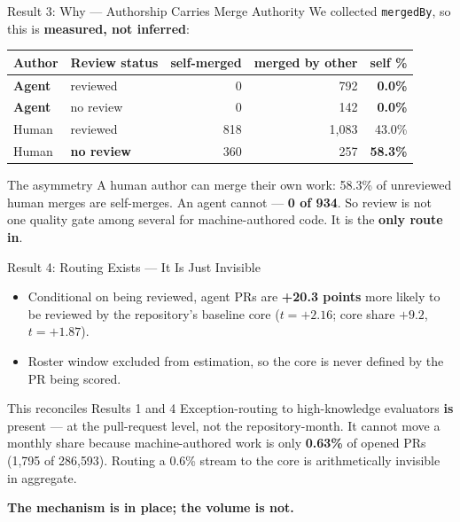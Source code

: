 \begin{frame}{Result 3: Why --- Authorship Carries Merge Authority}
We collected \texttt{mergedBy}, so this is \textbf{measured, not inferred}:
\begin{center}\small
\begin{tabular}{llrrr}
\toprule
Author & Review status & self-merged & merged by other & self \%\\
\midrule
\textbf{Agent} & reviewed & 0 & 792 & \textbf{0.0\%}\\
\textbf{Agent} & no review & 0 & 142 & \textbf{0.0\%}\\
Human & reviewed & 818 & 1{,}083 & 43.0\%\\
Human & \textbf{no review} & 360 & 257 & \textbf{58.3\%}\\
\bottomrule
\end{tabular}
\end{center}
\vfill
\begin{block}{The asymmetry}
  A human author can merge their own work: 58.3\% of unreviewed human merges
  are self-merges. An agent cannot --- \textbf{0 of 934}. So review is not one
  quality gate among several for machine-authored code. It is the
  \textbf{only route in}.
\end{block}
\end{frame}

\begin{frame}{Result 4: Routing Exists --- It Is Just Invisible}
\begin{itemize}
  \item Conditional on being reviewed, agent PRs are \textbf{+20.3 points}
        more likely to be reviewed by the repository's baseline core
        ($t=+2.16$; core share $+9.2$, $t=+1.87$).
  \item Roster window excluded from estimation, so the core is never defined
        by the PR being scored.
\end{itemize}
\vfill
\begin{block}{This reconciles Results 1 and 4}
  Exception-routing to high-knowledge evaluators \textbf{is} present --- at the
  pull-request level, not the repository-month. It cannot move a monthly share
  because machine-authored work is only \textbf{0.63\%} of opened PRs
  (1{,}795 of 286{,}593). Routing a 0.6\% stream to the core is arithmetically
  invisible in aggregate.
\end{block}
\vfill
\textbf{The mechanism is in place; the volume is not.}
\end{frame}

